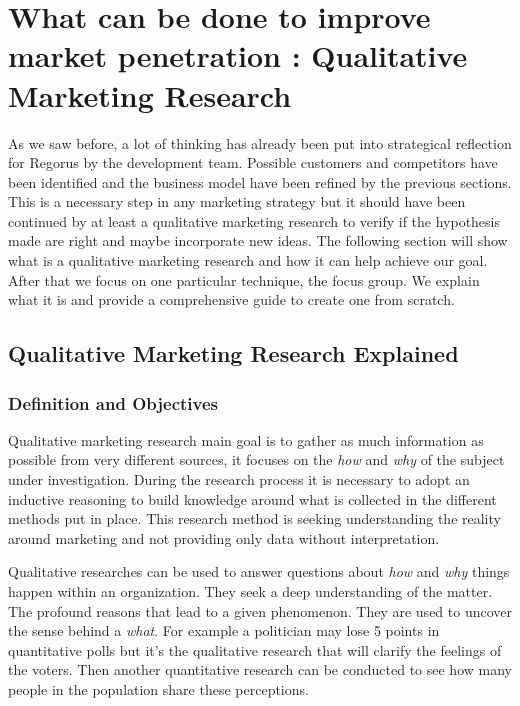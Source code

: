 \documentclass[10pt]{report}
\begin{document}
\section{What can be done to improve market penetration : Qualitative Marketing Research}

As we saw before, a lot of thinking has already been put into strategical reflection for Regorus by the development team. Possible customers and competitors have been identified and the business model have been refined by the previous sections. This is a necessary step in any marketing strategy but it should have been continued by at least a qualitative marketing research to verify if the hypothesis made are right and maybe incorporate new ideas. The following section will show what is a qualitative marketing research and how it can help achieve our goal. After that we focus on one particular technique, the focus group. We explain what it is and provide a comprehensive guide to create one from scratch.

\subsection{Qualitative Marketing Research Explained}

\subsubsection{Definition and Objectives}
Qualitative marketing research main goal is to gather as much information as possible from very different sources, it focuses on the \emph{how} and \emph{why} of the subject under investigation. During the research process it is necessary to adopt an inductive reasoning to build knowledge around what is collected in the different methods put in place. This research method is seeking understanding the reality around marketing and not providing only data without interpretation. \autocite{carson2001}

Qualitative researches can be used to answer questions about \emph{how} and \emph{why} things happen within an organization. They seek a deep understanding of the matter. The profound reasons that lead to a given phenomenon. They are used to uncover the sense behind a \emph{what}. For example a politician may lose 5 points in quantitative polls but it's the qualitative research that will clarify the feelings of the voters. Then another quantitative research can be conducted to see how many people in the population share these perceptions.
\end{document}
